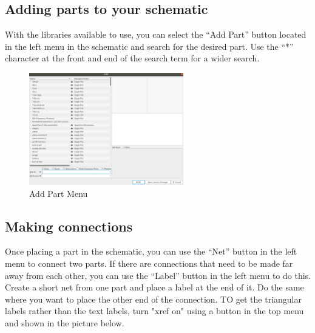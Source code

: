\documentclass{article}
\begin{document}
\subsection{Adding parts to your schematic}
With the libraries available to use, you can select the “Add Part” button located in the left menu in the schematic and search for the desired part. Use the “*” character at the front and end of the search term for a wider search.
\begin{figure}[ht]
	\center
	\includegraphics[width=0.6\textwidth, keepaspectratio]{images/addpart.png}
	\caption{Add Part Menu}
	\label{fig:addpart}
\end{figure}
\subsection{Making connections}
Once placing a part in the schematic, you can use the “Net” button in the left menu to connect two parts. If there are connections that need to be made far away from each other, you can use the “Label” button in the left menu to do this. Create a short net from one part and  place a label at the end of it. Do the same where you want to place the other end of the connection. TO get the triangular labels rather than the text labels, turn "xref on" using a button in the top menu and shown in the picture below. 
\end{document}
